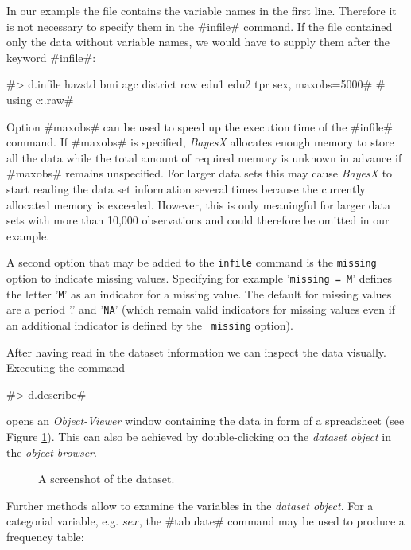\documentclass{article}
\begin{document}
In our example the file contains the variable names in the first
line. Therefore  it is not necessary to specify them in the
#infile# command. If the file contained only the data without
variable names, we would have to supply them after the keyword
#infile#:

 #> d.infile hazstd bmi agc district rcw edu1 edu2 tpr sex, maxobs=5000#
 #  using c:\data\zambia.raw#


Option #maxobs# can be used to speed up the execution time of the
#infile# command. If #maxobs# is specified, {\it BayesX} allocates
enough memory to store all the data while the total amount of
required memory is unknown in advance if #maxobs# remains
unspecified. For larger data sets this may cause {\it BayesX} to
start reading the data set information several times because the
currently allocated memory is exceeded. However, this is only
meaningful for larger data sets with more than 10,000 observations
and could therefore be omitted in our example.

A second option that may be added to the {\tt infile} command is the
{\tt missing} option to indicate missing values. Specifying for
example '{\tt missing = M}' defines the letter '{\tt M}' as an
indicator for a missing value. The default for missing values are a
period '.' and '{\tt NA}' (which remain valid indicators for missing
values even if an additional indicator is defined by the {\tt
missing} option).

After having read in the dataset information we can inspect the
data visually. Executing the command

#> d.describe#

opens an {\it Object-Viewer} window containing the data in form of
a spreadsheet (see Figure \ref{screenshot}). This can also be
achieved by double-clicking on the {\it dataset object} in the
{\it object browser}.

\vspace{1cm}

\begin{figure}[ht]
\begin{center}
 {\it\caption{A
screenshot of the dataset.\label{screenshot}}}
\end{center}
\end{figure}

Further methods allow to examine the variables in the {\it dataset
object}. For a categorial variable, e.g. $sex$, the #tabulate#
command may be used to produce a frequency table:
\end{document}
